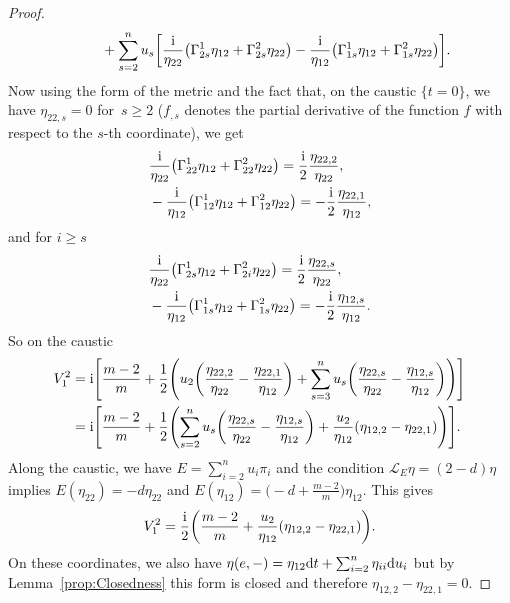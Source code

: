 \documentclass[pdftex]{sigma}
\numberwithin{equation}{section}
\begin{document}
\begin{proof}
\begin{gather*}
\hphantom{V^{2}_{1}=}{}+\sum_{s=2}^{n}u_{s}\bigg[ \frac{{\rm i}}{\eta_{22}}\bigl(\Gamma_{2s}^{1}\eta_{12}+\Gamma_{2s}^{2}\eta_{22} \bigr)-\frac{{\rm i}}{\eta_{12}}\bigl(\Gamma_{1s}^{1}\eta_{12}+\Gamma_{1s}^{2}\eta_{22} \bigr)\bigg].
\end{gather*}
 Now using the form of the metric and the fact that, on the caustic $\{ t=0 \}$, we have $\eta_{22,s}=0$ for~$s\geq 2$ ($f_{,s}$ denotes the partial derivative of the function $f$ with respect to the $s$-th coordinate), we get
 \begin{align*}
 &\frac{{\rm i}}{\eta_{22}}\bigl(\Gamma_{22}^{1}\eta_{12}+\Gamma_{22}^{2}\eta_{22} \bigr)=\frac{{\rm i}}{2}\frac{\eta_{22,2}}{\eta_{22}},\\
 &-\frac{{\rm i}}{\eta_{12}}\bigl(\Gamma_{12}^{1}\eta_{12}+\Gamma_{12}^{2}\eta_{22} \bigr)=-\frac{{\rm i}}{2}\frac{\eta_{22,1}}{\eta_{12}},
 \end{align*}
 and for $i\geq s$
 \begin{align*}
 &\frac{{\rm i}}{\eta_{22}}\bigl(\Gamma_{2s}^{1}\eta_{12}+\Gamma_{2i}^{2}\eta_{22} \bigr)=\frac{{\rm i}}{2}\frac{\eta_{22,s}}{\eta_{22}},\\
 &-\frac{{\rm i}}{\eta_{12}}\bigl(\Gamma_{1s}^{1}\eta_{12}+\Gamma_{1s}^{2}\eta_{22} \bigr)=-\frac{{\rm i}}{2}\frac{\eta_{12,s}}{\eta_{12}}.
 \end{align*}
 So on the caustic
 \begin{align*}
 V_{1}^{2}&={\rm i}\Bigg[ \frac{m-2}{m}+\frac{1}{2}\Biggl( u_{2}\biggl( \frac{\eta_{22,2}}{\eta_{22}}-\frac{\eta_{22,1}}{\eta_{12}}\biggr)+\sum_{s=3}^{n}u_{s}\biggl( \frac{\eta_{22,s}}{\eta_{22}}-\frac{\eta_{12,s}}{\eta_{12}}\biggr)\Biggr)\Bigg]\\
 &={\rm i}\Bigg[ \frac{m-2}{m}+\frac{1}{2}\Biggl( \sum_{s=2}^{n}u_{s}\biggl( \frac{\eta_{22,s}}{\eta_{22}}-\frac{\eta_{12,s}}{\eta_{12}}\biggr)+\frac{u_{2}}{\eta_{12}}(\eta_{12,2}-\eta_{22,1})\Biggr)\Bigg].
 \end{align*}
 Along the caustic, we have $E=\sum_{i=2}^{n}u_{i}\pi_{i}$ and the condition $\mathcal{L}_{E}\eta=(2-d)\eta$ implies $E(\eta_{22})=-d\eta_{22}$ and $E(\eta_{12})=\bigl(-d+\frac{m-2}{m}\bigr)\eta_{12}$. This gives
 \begin{equation*}
 V^{2}_{1}=\frac{{\rm i}}{2}\biggl( \frac{m-2}{m}+\frac{u_{2}}{\eta_{12}}(\eta_{12,2}-\eta_{22,1})\biggr).
 \end{equation*}
On these coordinates, we also have $\eta(e,-)=\eta_{12}{\rm d}t+\sum_{i=2}^{n}\eta_{ii}{\rm d}u_{i}$ but by Lemma~\ref{prop:Closedness} this form is closed and therefore $\eta_{12,2}-\eta_{22,1}=0$.
\end{proof}
\end{document}
